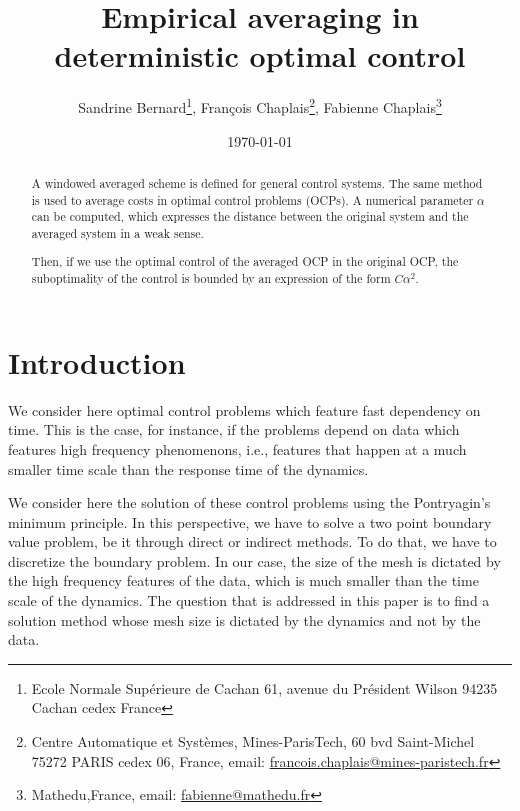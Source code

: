 \documentclass[a4paper,10pt]{article}
\begin{document}
\title{Empirical averaging in deterministic optimal control}
\date{\today}
\author{Sandrine Bernard\thanks{Ecole Normale Supérieure de Cachan
61, avenue du Président Wilson
94235 Cachan cedex France}, François Chaplais\thanks{Centre 
Automatique et Systèmes, Mines-ParisTech, 60 bvd 
Saint-Michel 75272 PARIS cedex 06, France, email: 
\href{mailto:francois.chaplais@mines-paristech.fr}{francois.chaplais@mines-paristech.fr}}, Fabienne 
Chaplais\thanks{Mathedu,France, email: \href{mailto:fabienne@mathedu.fr}{fabienne@mathedu.fr}}
}



\maketitle

\begin{abstract}
    A windowed averaged scheme is defined for general control 
    systems. The same method is used to average costs in optimal 
    control problems (OCPs). A numerical parameter $\alpha$ can be computed, which 
    expresses the distance between the original system and the 
    averaged system in a weak sense. 
    
    Then, if we use the optimal control of the averaged OCP in the 
    original OCP, the suboptimality of the control is bounded by an  
    expression of the form $C\alpha^{2}$.
\end{abstract}

\section{Introduction}
We consider here optimal control problems which feature fast 
dependency on time. This is the case, for instance, if the problems 
depend on data which features high frequency phenomenons, i.e., 
features that happen at a much smaller time scale than the response 
time of the dynamics.

We consider here the solution of these control problems using  the 
Pontryagin's minimum principle. In this perspective, we have to solve 
a two point boundary value problem, be it through direct or indirect 
methods. To do that, we have to discretize the boundary problem. In 
our case, the size of the mesh is dictated by the high frequency 
features of the data, which is much smaller than the time scale of the 
dynamics. The question that is addressed in this paper is to find a 
solution method whose mesh size is dictated by the dynamics and not by
the data.
\end{document}
